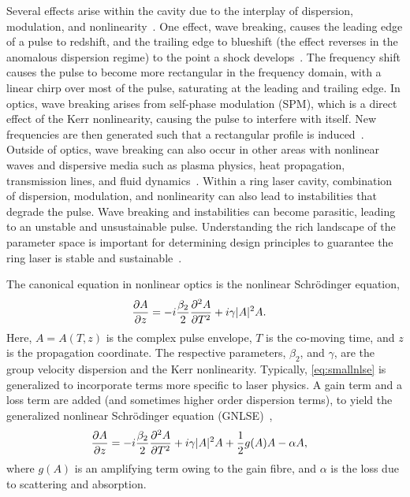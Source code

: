 \documentclass[9pt,twocolumn,twoside]{osajnl}
\newcommand{\pdiff}[3][\hspace{-0.5pt}]{\frac{\partial^{#1}#2}{\partial{#3}^{#1}}} %
\begin{document}
Several effects arise within the cavity due to the interplay of dispersion, modulation, and nonlinearity~\cite{bohun2015, coen1997, lapre2019, meng2020, oktem2010, shao2019, woodward2018}. One effect, wave breaking, causes the leading edge of a pulse to redshift, and the trailing edge to blueshift (the effect reverses in the anomalous dispersion regime) to the point a shock develops~\cite{anderson1992, rothenberg1989a, rothenberg1989b, tomlinson1984, tomlinson1985}. The frequency shift causes the pulse to become more rectangular in the frequency domain, with a linear chirp over most of the pulse, saturating at the leading and trailing edge. In optics, wave breaking arises from self-phase modulation (SPM), which is a direct effect of the Kerr nonlinearity, causing the pulse to interfere with itself. New frequencies are then generated such that a rectangular profile is induced~\cite{agrawal2013, woodward2018}. Outside of optics, wave breaking can also occur in other areas with nonlinear waves and dispersive media such as plasma physics, heat propagation, transmission lines, and fluid dynamics~\cite{coen1997, rothenberg1989b}. Within a ring laser cavity, combination of dispersion, modulation, and nonlinearity can also lead to instabilities that degrade the pulse. Wave breaking and instabilities can become parasitic, leading to an unstable and unsustainable pulse. Understanding the rich landscape of the parameter space is important for determining design principles to guarantee the ring laser is stable and sustainable~\cite{bohun2015, burgoyneemail, finot2008, lapre2019, woodward2018}.

The canonical equation in nonlinear optics is the nonlinear Schr\"odinger equation,
\begin{align}
	\pdiff{A}{z} &= - i \frac{\beta_2}{2}\pdiff[2]{A}{T} + i \gamma |A|^2 A.
	\label{eq:smallnlse}
\end{align}
Here, $A = A(T, z)$ is the complex pulse envelope, $T$ is the co-moving time, and $z$ is the propagation coordinate. The respective parameters, $\beta_2$, and $\gamma$, are the group velocity dispersion and the Kerr nonlinearity. Typically, \eqref{eq:smallnlse} is generalized to incorporate terms more specific to laser physics. A gain term and a loss term are added (and sometimes higher order dispersion terms), to yield the generalized nonlinear Schr\"odinger equation (GNLSE)~\cite{agrawal2013, bohun2015, finot2008, peng2018, shtyrina2017, yarutkina2013},
	\begin{align}
	\pdiff{A}{z} &= - i \frac{\beta_2}{2}\pdiff[2]{A}{T} + i \gamma |A|^2 A + \frac{1}{2}g(A) A - \alpha A,
	\label{eq:nlse}
\end{align}
where $g(A)$ is an amplifying term owing to the gain fibre, and $\alpha$ is the loss due to scattering and absorption.
\end{document}
